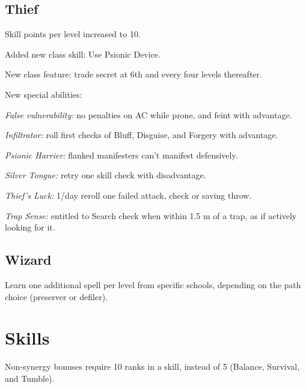 \subsection{Thief}
\begin{itemize*}
\item Skill points per level increased to 10.
\item Added new class skill: Use Psionic Device.
\item New class feature: trade secret at 6th and every four levels thereafter.
\item New special abilities:
	\begin{itemize*}
	\item \textit{False vulnerability:} no penalties on AC while prone, and feint with advantage.
	\item \textit{Infiltrator:} roll first checks of Bluff, Disguise, and Forgery with advantage.
	\item \textit{Psionic Harrier:} flanked manifesters can't manifest defensively.
	\item \textit{Silver Tongue:} retry one skill check with disadvantage.
	\item \textit{Thief's Luck:} 1/day reroll one failed attack, check or saving throw.
	\item \textit{Trap Sense:} entitled to Search check when within 1.5 m of a trap, as if actively looking for it.
	\end{itemize*}
\end{itemize*}

\subsection{Wizard}
\begin{itemize*}
\item Learn one additional spell per level from specific schools, depending on the path choice (preserver or defiler).
\end{itemize*}

\section{Skills}
Non-synergy bonuses require 10 ranks in a skill, instead of 5 (Balance, Survival, and Tumble).


